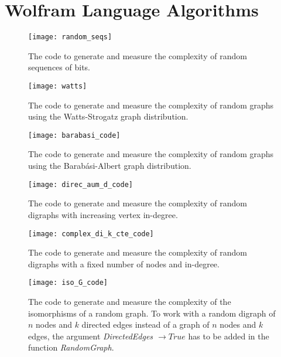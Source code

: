 

\section{Wolfram Language Algorithms}
\label{codes_wolfram}

\begin{figure}[h]
	\centering
		\texttt{[image: random\_seqs]}
	\caption{The code to generate and measure the complexity of random sequences of bits.}
	\label{fig:random_seqs_code}
\end{figure}

\begin{figure}[h]
	\centering
		\texttt{[image: watts]}
	\caption{The code to generate and measure the complexity of random graphs using the Watts-Strogatz graph distribution.}
	\label{fig:watts_code}
\end{figure}

\begin{figure}[h]
	\centering
		\texttt{[image: barabasi\_code]}
	\caption{The code to generate and measure the complexity of random graphs using the Barabási-Albert graph distribution.}
	\label{fig:barabasi_code}
\end{figure}

\begin{figure}[h]
	\centering
		\texttt{[image: direc\_aum\_d\_code]}
	\caption{The code to generate and measure the complexity of random digraphs with increasing vertex in-degree.}
	\label{fig:direc_aum_d_code}
\end{figure}

\begin{figure}[h]
	\centering
		\texttt{[image: complex\_di\_k\_cte\_code]}
	\caption{The code to generate and measure the complexity of random digraphs with a fixed number of nodes and in-degree.}
	\label{fig:complex_di_k_cte_code}
\end{figure}

\begin{figure}[h]
	\centering
		\texttt{[image: iso\_G\_code]}
	\caption[The code to generate and measure the complexity of the isomorphisms of a random graph.]{The code to generate and measure the complexity of the isomorphisms of a random graph. To work with a random digraph of $n$ nodes and $k$ directed edges instead of a graph of $n$ nodes and $k$ edges, the argument \textit{DirectedEdges $\rightarrow True$} has to be added in the function \textit{RandomGraph}.}
	\label{fig:iso_G_code}
\end{figure}

